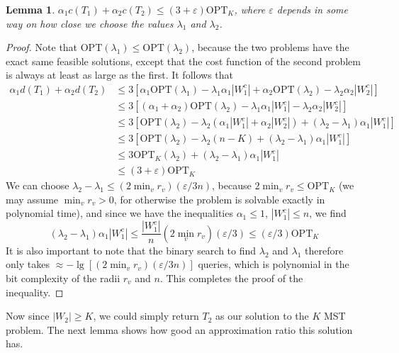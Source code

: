 \documentclass{article}
\theoremstyle{plain}
\newtheorem{lemma}{Lemma}
\begin{document}
\begin{lemma}
    $\alpha_1 c(T_1) + \alpha_2 c(T_2) \leq (3 + \varepsilon) \text{OPT}_K$, where $\varepsilon$ depends in some way on how close we choose the values $\lambda_1$ and $\lambda_2$.
\end{lemma}
\begin{proof}
    Note that $\text{OPT}(\lambda_1) \leq \text{OPT}(\lambda_2)$, because the two problems have the exact same feasible solutions, except that the cost function of the second problem is always at least as large as the first. It follows that
    \begin{align*}
        \alpha_1 d(T_1) + \alpha_2 d(T_2) &\leq 3[\alpha_1 \text{OPT}(\lambda_1) - \lambda_1 \alpha_1 |W_1^c| + \alpha_2 \text{OPT}(\lambda_2) - \lambda_2 \alpha_2 |W_2^c|]\\
        &\leq 3[(\alpha_1 + \alpha_2) \text{OPT}(\lambda_2) - \lambda_1 \alpha_1 |W_1^c| - \lambda_2 \alpha_2 |W_2^c|]\\
        &\leq 3[\text{OPT}(\lambda_2) - \lambda_2(\alpha_1 |W_1^c| + \alpha_2 |W_2^c|) + (\lambda_2 - \lambda_1) \alpha_1 |W_1^c|]\\
        &\leq 3[ \text{OPT}(\lambda_2) - \lambda_2(n-K) + (\lambda_2 - \lambda_1) \alpha_1 |W_1^c|]\\
        &\leq 3 \text{OPT}_K(\lambda_2) + (\lambda_2 - \lambda_1) \alpha_1 |W_1^c|\\
        &\leq (3 + \varepsilon) \text{OPT}_K
    \end{align*}
    We can choose $\lambda_2 - \lambda_1 \leq (2 \min_v r_v) (\varepsilon/3n)$, because $2 \min_v r_v \leq \text{OPT}_K$ (we may assume $\min_v r_v > 0$, for otherwise the problem is solvable exactly in polynomial time), and since we have the inequalities $\alpha_1 \leq 1$, $|W_1^c| \leq n$, we find
    \[ (\lambda_2 - \lambda_1) \alpha_1 |W_1^c| \leq \frac{|W_1^c|}{n} (2 \min_v r_v) (\varepsilon/3) \leq (\varepsilon/3) \text{OPT}_K \]
    It is also important to note that the binary search to find $\lambda_2$ and $\lambda_1$ therefore only takes $\approx -\lg[(2 \min_v r_v) (\varepsilon/3n)]$ queries, which is polynomial in the bit complexity of the radii $r_v$ and $n$. This completes the proof of the inequality.
\end{proof}

Now since $|W_2| \geq K$, we could simply return $T_2$ as our solution to the $K$ MST problem. The next lemma shows how good an approximation ratio this solution has.
\end{document}
